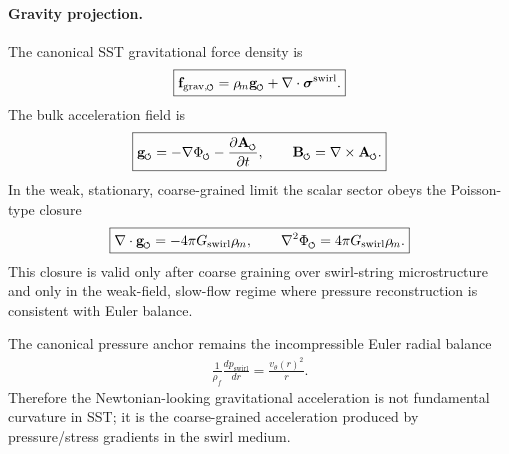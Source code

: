 \documentclass[11pt]{article}
\theoremstyle{definition}
\theoremstyle{plain}
\theoremstyle{remark}
\newcommand{\swirlarrow}{\mathchoice{\mkern-2mu\scriptstyle\boldsymbol{\circlearrowleft}}{\mkern-2mu\scriptstyle\boldsymbol{\circlearrowleft}}{\mkern-2mu\scriptscriptstyle\boldsymbol{\circlearrowleft}}{\mkern-2mu\scriptscriptstyle\boldsymbol{\circlearrowleft}}}
\newcommand{\rhoF}{{\rho_{\!f}}}
\newcommand{\rhoM}{\rho_{\!m}}
\begin{document}
        \paragraph{Gravity projection.}
        The canonical SST gravitational force density is
        \begin{align}
            \boxed{
            \mathbf{f}_{\mathrm{grav},\swirlarrow}
            =
            \rhoM\mathbf{g}_{\swirlarrow}
            +
            \nabla\cdot\boldsymbol{\sigma}^{\mathrm{swirl}}.
            }
            \label{eq:canonical_sst_grav_force_density}
        \end{align}
        The bulk acceleration field is
        \begin{align}
            \boxed{
            \mathbf{g}_{\swirlarrow}
            =
            -\nabla\Phi_{\swirlarrow}
            -
            \frac{\partial\mathbf{A}_{\swirlarrow}}{\partial t},
            \qquad
            \mathbf{B}_{\swirlarrow}
            =
            \nabla\times\mathbf{A}_{\swirlarrow}.
            }
            \label{eq:canonical_gravito_swirl_fields}
        \end{align}
        In the weak, stationary, coarse-grained limit the scalar sector obeys the Poisson-type closure
        \begin{align}
            \boxed{
            \nabla\cdot\mathbf{g}_{\swirlarrow}
            =
            -4\pi G_{\mathrm{swirl}}\rhoM,
            \qquad
            \nabla^2\Phi_{\swirlarrow}
            =
            4\pi G_{\mathrm{swirl}}\rhoM.
            }
            \label{eq:canonical_weak_gravity_closure}
        \end{align}
        This closure is valid only after coarse graining over swirl-string microstructure and only in the weak-field, slow-flow regime where pressure reconstruction is consistent with Euler balance.

        The canonical pressure anchor remains the incompressible Euler radial balance
        \begin{align}
            \boxed{
            \frac{1}{\rhoF}\frac{dp_{\mathrm{swirl}}}{dr}
            =
            \frac{v_\theta(r)^2}{r}.
            }
            \label{eq:canonical_emg_euler_anchor}
        \end{align}
        Therefore the Newtonian-looking gravitational acceleration is not fundamental curvature in SST; it is the coarse-grained acceleration produced by pressure/stress gradients in the swirl medium.
\end{document}
